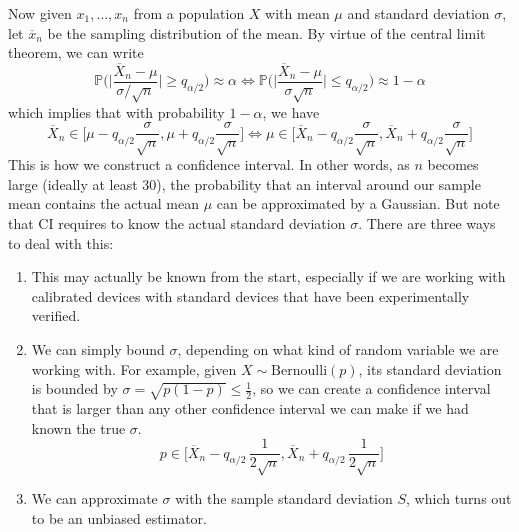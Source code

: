   Now given $x_1, \ldots, x_n$ from a population $X$ with mean $\mu$ and standard deviation $\sigma$, let $\overline{x}_n$ be the sampling distribution of the mean. By virtue of the central limit theorem, we can write
  \begin{equation}
    \mathbb{P} \bigg( \bigg| \frac{\overline{X}_n - \mu}{\sigma / \sqrt{n}} \bigg| \geq q_{\alpha/2} \bigg) \approx \alpha \iff \mathbb{P} \bigg( \bigg| \frac{\overline{X}_n - \mu}{\sigma \sqrt{n}} \bigg| \leq q_{\alpha/2} \bigg) \approx 1 - \alpha
  \end{equation}
  which implies that with probability $1 - \alpha$, we have 
  \begin{equation}
    \overline{X}_n \in \bigg[ \mu - q_{\alpha/2} \frac{\sigma}{\sqrt{n}}, \mu + q_{\alpha/2} 
    \frac{\sigma}{\sqrt{n}} \bigg] \iff \mu \in \bigg[ \overline{X}_n - q_{\alpha/2} \frac{\sigma}{\sqrt{n}}, \overline{X}_n + q_{\alpha/2} \frac{\sigma}{\sqrt{n}} \bigg]
  \end{equation}
  This is how we construct a confidence interval. In other words, as $n$ becomes large (ideally at least $30$), the probability that an interval around our sample mean contains the actual mean $\mu$ can be approximated by a Gaussian. But note that CI requires to know the actual standard deviation $\sigma$. There are three ways to deal with this: 
  \begin{enumerate}
    \item This may actually be known from the start, especially if we are working with calibrated devices with standard devices that have been experimentally verified.

    \item We can simply bound $\sigma$, depending on what kind of random variable we are working with. For example, given $X \sim \mathrm{Bernoulli}(p)$, its standard deviation is bounded by $\sigma = \sqrt{p (1 - p)} \leq \frac{1}{2}$, so we can create a confidence interval that is larger than any other confidence interval we can make if we had known the true $\sigma$. 
    \begin{equation}
      p \in \bigg[ \overline{X}_n - q_{\alpha/2} \, \frac{1}{2 \sqrt{n}}, \overline{X}_n + q_{\alpha/2} \,\frac{1}{2 \sqrt{n}} \bigg]
    \end{equation}

    \item We can approximate $\sigma$ with the sample standard deviation $S$, which turns out to be an unbiased estimator. 
  \end{enumerate}

